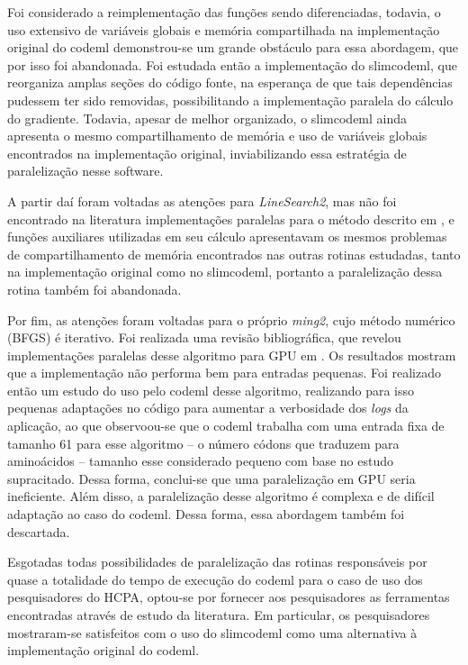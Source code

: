 \documentclass[cic,tc]{iiufrgs}
\begin{document}
Foi considerado a reimplementação das funções sendo diferenciadas, todavia, o
uso extensivo de variáveis globais e memória compartilhada na implementação
original do codeml demonstrou-se um grande obstáculo para essa abordagem, que
por isso foi abandonada. Foi estudada então a implementação do slimcodeml, que
reorganiza amplas seções do código fonte, na esperança de que tais
dependências pudessem ter sido removidas, possibilitando a implementação
paralela do cálculo do gradiente. Todavia, apesar de melhor organizado, o
slimcodeml ainda apresenta o mesmo compartilhamento de memória e uso de
variáveis globais encontrados na implementação original, inviabilizando essa
estratégia de paralelização nesse software.

A partir daí foram voltadas as atenções para \textit{LineSearch2}, mas não foi
encontrado na literatura implementações paralelas para o método descrito em
\cite{wolfe1978numerical}, e funções auxiliares utilizadas em seu cálculo
apresentavam os mesmos problemas de compartilhamento de memória encontrados nas
outras rotinas estudadas, tanto na implementação original como no slimcodeml,
portanto a paralelização dessa rotina também foi abandonada.

Por fim, as atenções foram voltadas para o próprio \textit{ming2}, cujo método
numérico (BFGS) é iterativo. Foi realizada uma revisão bibliográfica, que
revelou implementações paralelas desse algoritmo para GPU em
\cite{fei2014parallel}. Os resultados mostram que a implementação não
performa bem para entradas pequenas. Foi realizado então um estudo do uso pelo
codeml desse algoritmo, realizando para isso pequenas adaptações no código para
aumentar a verbosidade dos \textit{logs} da aplicação, ao que observoou-se  que
o codeml trabalha com uma entrada fixa de tamanho 61 para esse algoritmo -- o
número códons que traduzem para aminoácidos -- tamanho esse considerado pequeno
com base no estudo supracitado. Dessa forma, conclui-se que uma paralelização
em GPU seria ineficiente. Além disso, a paralelização desse algoritmo é
complexa e de difícil adaptação ao caso do codeml. Dessa forma, essa abordagem
também foi descartada.

Esgotadas todas possibilidades de paralelização das rotinas responsáveis por
quase a totalidade do tempo de execução do codeml para o caso de uso dos
pesquisadores do HCPA, optou-se por fornecer aos pesquisadores as ferramentas
encontradas através de estudo da literatura. Em particular, os pesquisadores
mostraram-se satisfeitos com o uso do slimcodeml como uma alternativa à
implementação original do codeml.
\end{document}
